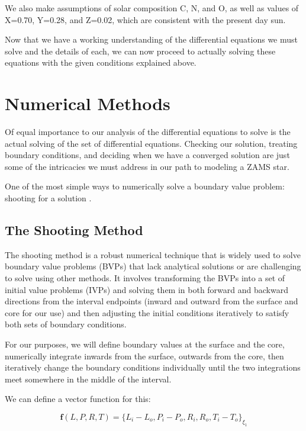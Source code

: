 \documentclass[twocolumn]{aastex631}
\begin{document}
We also make assumptions of solar composition C, N, and O, as well as values of X=0.70, Y=0.28, and Z=0.02, which are consistent with the present day sun. 

Now that we have a working understanding of the differential equations we must solve and the details of each, we can now proceed to actually solving these equations with the given conditions  explained above.


\section{Numerical Methods}

Of equal importance to our analysis of the differential equations to solve is the actual solving of the set of differential equations. Checking our solution, treating boundary conditions, and deciding when we have a converged solution are just some of the intricacies we must address in our path to modeling a ZAMS star. 

One of the most simple ways to numerically solve a boundary value problem: shooting for a solution \citep{numrec}.

\subsection{The Shooting Method}

The shooting method is a robust numerical technique that is widely used to solve boundary value problems (BVPs) that lack analytical solutions or are challenging to solve using other methods.  It involves transforming the BVPs into a set of initial value problems (IVPs) and solving them in both forward and backward directions from the interval endpoints (inward and outward from the surface and core for our use) and then adjusting the initial conditions iteratively to satisfy both sets of boundary conditions. 

For our purposes, we will define boundary values at the surface and the core, numerically integrate inwards from the surface, outwards from the core, then iteratively change the boundary conditions individually until the two integrations meet somewhere in the middle of the interval. 

We can define a vector function for this:

\begin{equation}
	\label{eqn:diff}
	\textbf{f}(L, P, R, T) = \{ L_i - L_o, P_i - P_o, R_i, R_o, T_i - T_o \}_{\xi_1}
\end{equation}
\end{document}
